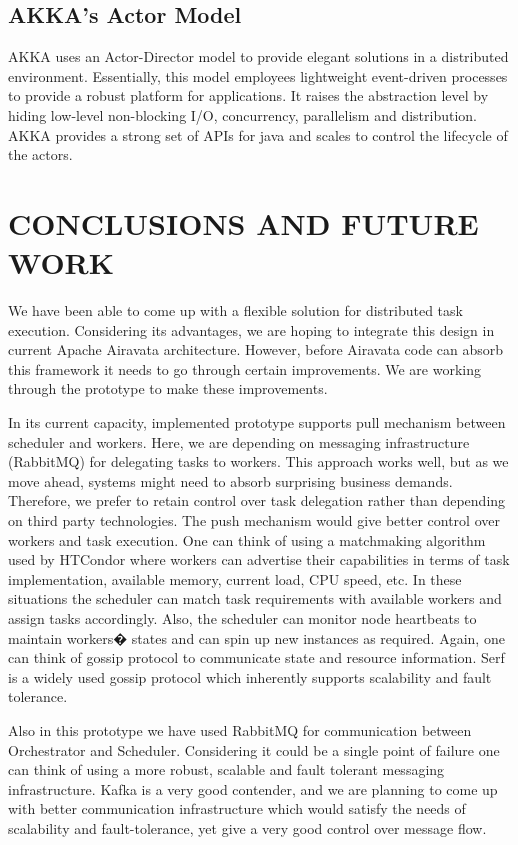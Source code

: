 \documentclass[sigconf]{acmart}
\begin{document}
\subsection{AKKA's Actor Model}
AKKA uses an Actor-Director model to provide elegant solutions in a distributed environment. Essentially, this model employees lightweight event-driven processes to provide a robust platform for applications. It raises the abstraction level by hiding low-level non-blocking I/O, concurrency, parallelism and distribution. AKKA provides a strong set of APIs for java and scales to control the lifecycle of the actors.

\section{CONCLUSIONS AND FUTURE WORK}
We have been able to come up with a flexible solution for distributed task execution. Considering its advantages, we are hoping to integrate this design in current Apache Airavata architecture. However, before Airavata code can absorb this framework it needs to go through certain improvements. We are working through the prototype to make these improvements. 

In its current capacity, implemented prototype supports pull mechanism between scheduler and workers. Here, we are depending on messaging infrastructure (RabbitMQ) for delegating tasks to workers. This approach works well, but as we move ahead, systems might need to absorb surprising business demands.  Therefore, we prefer to retain control over task delegation rather than depending on third party technologies. The push mechanism would give better control over workers and task execution. One can think of using a matchmaking algorithm used by HTCondor where workers can advertise their capabilities in terms of task implementation, available memory, current load, CPU speed, etc.  In these situations the scheduler can match task requirements with available workers and assign tasks accordingly. Also, the scheduler can monitor node heartbeats to maintain workers� states and can spin up new instances as required. Again, one can think of gossip protocol to communicate state and resource information. Serf is a widely used gossip protocol which inherently supports scalability and fault tolerance. 

Also in this prototype we have used RabbitMQ for communication between Orchestrator and Scheduler. Considering it could be a single point of failure one can think of using a more robust, scalable and fault tolerant messaging infrastructure. Kafka is a very good contender, and we are planning to come up with better communication infrastructure which would satisfy the needs of scalability and fault-tolerance, yet give a very good control over message flow.   
\end{document}
